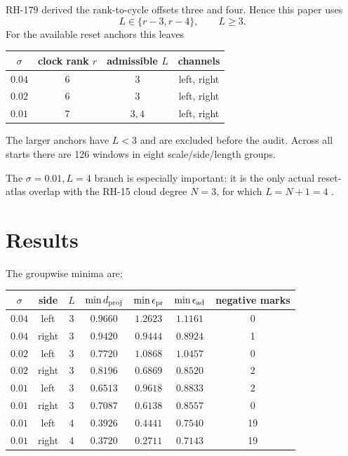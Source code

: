 \documentclass[12pt]{article}
\theoremstyle{remark}
\begin{document}
RH-179 derived the rank-to-cycle offsets three and four.  Hence this paper
uses
\begin{equation}\label{eq:lengths}
 L\in\{r-3,r-4\},\qquad L\ge3.
\end{equation}
For the available reset anchors this leaves
\begin{center}
\begin{tabular}{cccc}
\toprule
$\sigma$ & clock rank $r$ & admissible $L$ & channels\\
\midrule
$0.04$ & $6$ & $3$ & left, right\\
$0.02$ & $6$ & $3$ & left, right\\
$0.01$ & $7$ & $3,4$ & left, right\\
\bottomrule
\end{tabular}
\end{center}
The larger anchors have $L<3$ and are excluded before the audit.  Across all
starts there are 126 windows in eight scale/side/length groups.

The $\sigma=0.01,L=4$ branch is especially important: it is the only actual
reset-atlas overlap with the RH-15 cloud degree $N=3$, for which
$L=N+1=4$ \citep{WangRH15,WangRH181}.

\section{Results}

The groupwise minima are:
\begin{center}
\small
\begin{tabular}{ccccccc}
\toprule
$\sigma$ & side & $L$ & $\min d_{\rm proj}$
& $\min\epsilon_{\rm pr}$ & $\min\epsilon_{\rm ad}$
& negative marks\\
\midrule
$0.04$ & left  & 3 & $0.9660$ & $1.2623$ & $1.1161$ & 0\\
$0.04$ & right & 3 & $0.9420$ & $0.9444$ & $0.8924$ & 1\\
$0.02$ & left  & 3 & $0.7720$ & $1.0868$ & $1.0457$ & 0\\
$0.02$ & right & 3 & $0.8196$ & $0.6869$ & $0.8520$ & 2\\
$0.01$ & left  & 3 & $0.6513$ & $0.9618$ & $0.8833$ & 2\\
$0.01$ & right & 3 & $0.7087$ & $0.6138$ & $0.8557$ & 0\\
$0.01$ & left  & 4 & $0.3926$ & $0.4441$ & $0.7540$ & 19\\
$0.01$ & right & 4 & $0.3720$ & $0.2711$ & $0.7143$ & 19\\
\bottomrule
\end{tabular}
\end{center}
\end{document}
